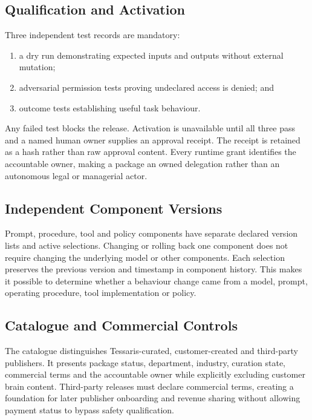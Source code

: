 \subsection{Qualification and Activation}

Three independent test records are mandatory:
\begin{enumerate}
  \item a dry run demonstrating expected inputs and outputs without external mutation;
  \item adversarial permission tests proving undeclared access is denied; and
  \item outcome tests establishing useful task behaviour.
\end{enumerate}

Any failed test blocks the release.  Activation is unavailable until all three pass and a
named human owner supplies an approval receipt.  The receipt is retained as a hash rather than
raw approval content.  Every runtime grant identifies the accountable owner, making a package
an owned delegation rather than an autonomous legal or managerial actor.

\subsection{Independent Component Versions}

Prompt, procedure, tool and policy components have separate declared version lists and active
selections.  Changing or rolling back one component does not require changing the underlying
model or other components.  Each selection preserves the previous version and timestamp in
component history.  This makes it possible to determine whether a behaviour change came from
a model, prompt, operating procedure, tool implementation or policy.

\subsection{Catalogue and Commercial Controls}

The catalogue distinguishes Tessaris-curated, customer-created and third-party publishers.
It presents package status, department, industry, curation state, commercial terms and the
accountable owner while explicitly excluding customer brain content.  Third-party releases
must declare commercial terms, creating a foundation for later publisher onboarding and
revenue sharing without allowing payment status to bypass safety qualification.

